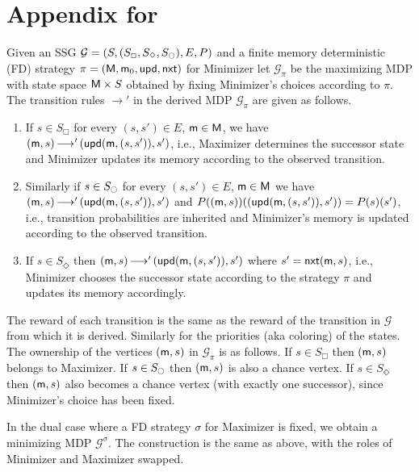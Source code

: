 \documentclass[a4paper,UKenglish,cleveref,autoref,thm-restate]{lipics-v2021}
\newcommand{\+}[1]{\mathbb{#1}}
\newcommand{\?}[1]{\mathcal{#1}}
\newcommand{\x}{\times}
\newcommand{\rsymbol}{\ocircle}
\newcommand{\zsymbol}{\Box}
\newcommand{\osymbol}{\Diamond}
\newcommand{\zstates}{\states_\zsymbol}
\newcommand{\rstates}{\states_\rsymbol}
\newcommand{\ostates}{\states_\osymbol}
\newcommand{\lrc}[1]{\left(#1\right)}
\newcommand{\tuple}[1]{\lrc{#1}}
\newcommand{\game}{{\mathcal G}}
\newcommand{\gametuple}{\tuple{\states,(\zstates,\ostates,\rstates),\transition,\probp}}
\newcommand{\states}{S}
\newcommand{\s}{s}
\newcommand{\transition}{{E}}
\newcommand{\movesto}{{\longrightarrow}}
\newcommand{\probp}{P}
\newcommand{\zstrat}{\sigma}
\newcommand{\ostrat}{\pi}
\newcommand{\memory}{{\sf M}}
\newcommand{\updatefun}{upd}
\newcommand{\memconf}{{\sf m}}
\newcommand{\memconfset}{{\sf M}}
\newcommand{\memsuc}{{\sf nxt}}
\newcommand{\memup}{{\sf \updatefun}}
\newcommand{\memstrattuple}{\tuple{\memory,\initmem,\memup,\memsuc}}
\newcommand{\initmem}{\memconf_0}
\begin{document}
\newpage



\newpage
\appendix
\section{Appendix for }\label{app:gain}

\begin{definition}\label{def:fix-fd}
Given an SSG $\game=\gametuple$ and a finite memory deterministic (FD)
strategy $\ostrat = \memstrattuple$ for Minimizer
let $\game_{\ostrat}$
be the maximizing
MDP with state space $\memconfset \x \states$
obtained by fixing Minimizer's
choices according to
$\ostrat$.
The transition rules $\movesto'$ in the derived MDP $\game_{\ostrat}$ are given as follows.
\begin{enumerate}
\item
  If $\s \in \zstates$
  for every $(\s,\s') \in \transition$, $\memconf \in \memconfset$,
  we have $(\memconf,\s)\, \movesto'\, (\memup(\memconf,(\s,\s')),\s')$,
  i.e., Maximizer determines the successor state and Minimizer updates its
  memory according to the observed transition. 
\item
  Similarly if $\s \in \rstates$
  for every $(\s,\s') \in \transition$, $\memconf \in \memconfset$
  we have
  $(\memconf,\s)\, \movesto'\, (\memup(\memconf,(\s,s')),\s')$
  and
  $\probp((\memconf,\s))((\memup(\memconf,(\s,s')),\s')) = \probp(\s)(\s')$,
  i.e., transition probabilities are inherited and Minimizer's memory is
  updated according to the observed transition.
\item
  If $\s \in \ostates$ then
  $(\memconf,\s)\, \movesto'\, (\memup(\memconf,(\s,\s')), \s')$ where $\s' = \memsuc(\memconf,\s)$,
  i.e., Minimizer chooses the successor state according to the
  strategy $\ostrat$ and updates its memory accordingly.
\end{enumerate}
The reward of each transition is the same as the reward of the 
transition in $\game$ from which it is derived. Similarly for the priorities
(aka coloring) of the states.
The ownership of the vertices $(\memconf, \s)$ in $\game_{\ostrat}$ is as follows.
If $\s \in \zstates$ then $(\memconf, \s)$ belongs to Maximizer.
If $\s \in \rstates$ then $(\memconf, \s)$ is also a chance vertex.
If $\s \in \ostates$ then $(\memconf, \s)$ also becomes a chance vertex (with
exactly one successor), since Minimizer's choice has been fixed.

In the dual case where a FD strategy $\zstrat$ for Maximizer is fixed,
we obtain a minimizing MDP $\game^{\zstrat}$. The construction is the same as
above, with the roles of Minimizer and Maximizer swapped.
\end{definition}
\end{document}
